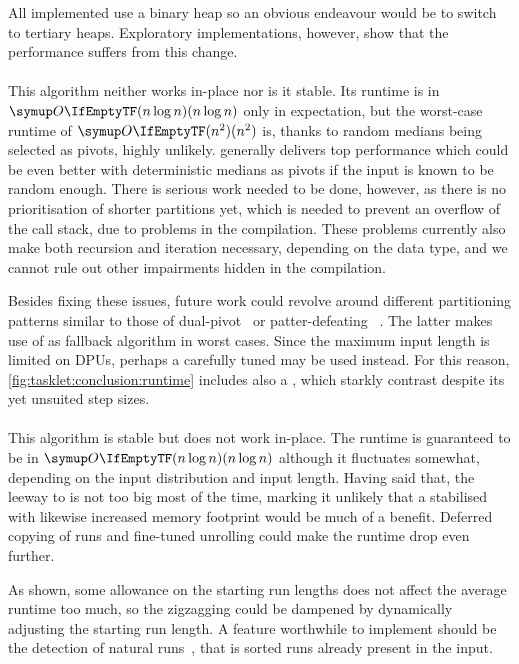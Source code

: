 All implemented \HS*{} use a binary heap so an obvious endeavour would be to switch to tertiary heaps.
Exploratory implementations, however, show that the performance suffers from this change.


\paragraph{\QS{}}
This algorithm neither works in-place nor is it stable.
Its runtime is in \(\bigoh{n \log n}\) only in expectation, but the worst-case runtime of \(\bigoh{n^2}\) is, thanks to random medians being selected as pivots, highly unlikely.
\QS{} generally delivers top performance which could be even better with deterministic medians as pivots if the input is known to be random enough.
There is serious work needed to be done, however, as there is no prioritisation of shorter partitions yet, which is needed to prevent an overflow of the call stack, due to problems in the compilation.
These problems currently also make both recursion and iteration necessary, depending on the data type, and we cannot rule out other impairments hidden in the compilation.

Besides fixing these issues, future work could revolve around different partitioning patterns similar to those of dual-pivot~\cite{wild2012averagecase} or patter-defeating \QS{}~\cite{peters2021patterndefeatingquicksort}.
The latter makes use of \HS{} as fallback algorithm in worst cases.
Since the maximum input length is limited on DPUs, perhaps a carefully tuned \ShS{} may be used instead.
For this reason, \cref{fig:tasklet:conclusion:runtime} includes also a \ShS{}, which starkly contrast \HS{} despite its yet unsuited step sizes.

\paragraph{\MS{}}
This algorithm is stable but does not work in-place.
The runtime is guaranteed to be in \(\bigoh{n \log n}\) although it fluctuates somewhat, depending on the input distribution and input length.
Having said that, the leeway to \QS{} is not too big most of the time, marking it unlikely that a stabilised \QS{} with likewise increased memory footprint would be much of a benefit.
Deferred copying of runs and fine-tuned unrolling could make the runtime drop even further.

As shown, some allowance on the starting run lengths does not affect the average runtime too much, so the zigzagging could be dampened by dynamically adjusting the starting run length.
A feature worthwhile to implement should be the detection of natural runs~\cite[Chapter~2.3.2]{wirth1975algorithmen}, that is sorted runs already present in the input.

